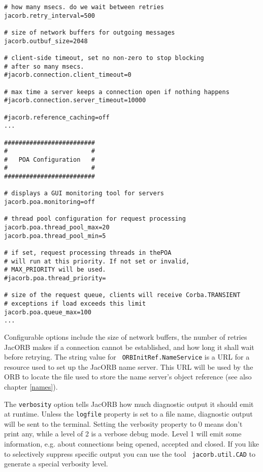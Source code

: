 \documentclass[12pt]{scrbook}
\begin{document}
{\begin{verbatim}
# how many msecs. do we wait between retries
jacorb.retry_interval=500

# size of network buffers for outgoing messages
jacorb.outbuf_size=2048

# client-side timeout, set no non-zero to stop blocking
# after so many msecs.
#jacorb.connection.client_timeout=0

# max time a server keeps a connection open if nothing happens
#jacorb.connection.server_timeout=10000

#jacorb.reference_caching=off
...

#########################
#                       #
#   POA Configuration   #
#                       #
#########################

# displays a GUI monitoring tool for servers
jacorb.poa.monitoring=off

# thread pool configuration for request processing
jacorb.poa.thread_pool_max=20
jacorb.poa.thread_pool_min=5

# if set, request processing threads in thePOA
# will run at this priority. If not set or invalid,
# MAX_PRIORITY will be used.
#jacorb.poa.thread_priority=

# size of the request queue, clients will receive Corba.TRANSIENT
# exceptions if load exceeds this limit
jacorb.poa.queue_max=100
...
\end{verbatim}
}
\renewcommand{\baselinestretch}{1.0}
\small\normalsize

Configurable options  include the size of network  buffers, the number
of retries JacORB makes if a connection cannot be established, and how
long  it  shall wait  before  retrying.   The  string value  for  {\tt
ORBInitRef.NameService} is  a URL  for a resource  used to set  up the
JacORB name  server. This URL  will be used  by the ORB to  locate the
file  used to  store  the  name server's  object  reference (see  also
chapter \ref{names}).

The {\tt verbosity} option tells  JacORB how much diagnostic output it
should emit at runtime. Unless the  {\tt logfile} property is set to a
file name, diagnostic output will  be sent to the terminal. Setting the
verbosity property to 0 means don't print any, while a level of 2 is a
verbose debug mode.   Level 1 will emit some  information, e.g.  about
connections  being  opened,  accepted  and  closed.  If  you  like  to
selectively  suppress  specific  output  you  can  use  the  tool  {\tt
jacorb.util.CAD} to generate a special verbosity level.
\end{document}
